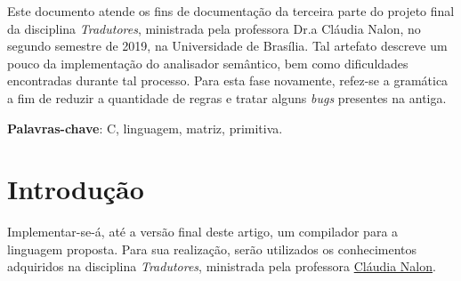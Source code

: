 \documentclass[
	article,			%
	11pt,				%
	oneside,			%
	a4paper,			%
	english,			%
	brazil,				%
	sumario=tradicional
	]{abntex2}
\renewcommand{\it}[1]{\textit{#1}}
\begin{document}

\frenchspacing 


%
%

\maketitle





\begin{resumoumacoluna}
 Este documento atende os fins de documentação da terceira
 parte do projeto final da disciplina \textit{Tradutores},
 ministrada pela professora Dr.a Cláudia Nalon, no segundo semestre de 2019, na Universidade de Brasília. Tal artefato descreve um pouco da implementação do analisador semântico, bem como dificuldades encontradas durante tal processo. Para esta fase novamente, refez-se a gramática a fim de reduzir a quantidade de regras e tratar alguns \it{bugs} presentes na antiga.
 \vspace{\onelineskip}
 
 \noindent
 \textbf{Palavras-chave}: C, linguagem, matriz, primitiva.
\end{resumoumacoluna}




\newcommand{\terminal}[1]{ \bnfpn{\textbf{#1}} }

\newcommand{\production}[1]{\bnfpn{\textit{#1}}}
\newcommand{\IT}[1]{\textit{#1}}
\newcommand{\BF}[1]{\textbf{#1}}


\section{Introdução}
Implementar-se-á, até a versão final deste artigo, um compilador para a linguagem proposta. Para sua realização, serão utilizados os conhecimentos adquiridos na disciplina \textit{Tradutores}, ministrada pela professora \hyperref{http://lattes.cnpq.br/7793795625581127}{}{}{Cláudia Nalon}.
\end{document}
